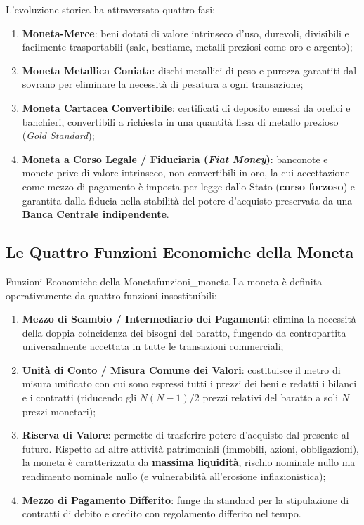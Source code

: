L'evoluzione storica ha attraversato quattro fasi:
\begin{enumerate}
    \item \textbf{Moneta-Merce}: beni dotati di valore intrinseco d'uso, durevoli, divisibili e facilmente trasportabili (sale, bestiame, metalli preziosi come oro e argento);
    \item \textbf{Moneta Metallica Coniata}: dischi metallici di peso e purezza garantiti dal sovrano per eliminare la necessità di pesatura a ogni transazione;
    \item \textbf{Moneta Cartacea Convertibile}: certificati di deposito emessi da orefici e banchieri, convertibili a richiesta in una quantità fissa di metallo prezioso (\textit{Gold Standard});
    \item \textbf{Moneta a Corso Legale / Fiduciaria (\textit{Fiat Money})}: banconote e monete prive di valore intrinseco, non convertibili in oro, la cui accettazione come mezzo di pagamento è imposta per legge dallo Stato (\textbf{corso forzoso}) e garantita dalla fiducia nella stabilità del potere d'acquisto preservata da una \textbf{Banca Centrale indipendente}.
\end{enumerate}

\subsection{Le Quattro Funzioni Economiche della Moneta}

\begin{definizione}{Funzioni Economiche della Moneta}{funzioni_moneta}
La moneta è definita operativamente da quattro funzioni insostituibili:
\begin{enumerate}
    \item \textbf{Mezzo di Scambio / Intermediario dei Pagamenti}: elimina la necessità della doppia coincidenza dei bisogni del baratto, fungendo da contropartita universalmente accettata in tutte le transazioni commerciali;
    \item \textbf{Unità di Conto / Misura Comune dei Valori}: costituisce il metro di misura unificato con cui sono espressi tutti i prezzi dei beni e redatti i bilanci e i contratti (riducendo gli $N(N-1)/2$ prezzi relativi del baratto a soli $N$ prezzi monetari);
    \item \textbf{Riserva di Valore}: permette di trasferire potere d'acquisto dal presente al futuro. Rispetto ad altre attività patrimoniali (immobili, azioni, obbligazioni), la moneta è caratterizzata da \textbf{massima liquidità}, rischio nominale nullo ma rendimento nominale nullo (e vulnerabilità all'erosione inflazionistica);
    \item \textbf{Mezzo di Pagamento Differito}: funge da standard per la stipulazione di contratti di debito e credito con regolamento differito nel tempo.
\end{enumerate}
\end{definizione}

